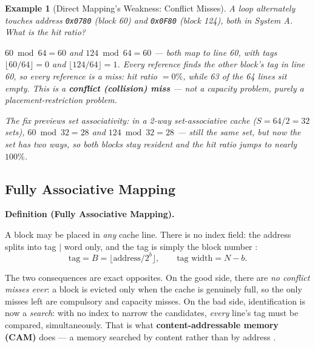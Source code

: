 \documentclass[11pt]{article}
\newtheorem{example}{Example}[section]
\newenvironment{definitionbox}[1]{%
  \par\noindent\textbf{Definition (#1).}\ \itshape
}{\par\vspace{0.3em}}
\begin{document}
\begin{example}[Direct Mapping's Weakness: Conflict Misses]
\label{ex:conflict}
A loop alternately touches address \texttt{0x0780} (block 60) and \texttt{0x0F80} (block 124), both in System A. What is the hit ratio?

$60 \bmod 64 = 60$ and $124 \bmod 64 = 60$ --- both map to line 60, with tags $\lfloor 60/64 \rfloor = 0$ and $\lfloor 124/64 \rfloor = 1$. Every reference finds the \emph{other} block's tag in line 60, so every reference is a miss: hit ratio $= 0\%$, while 63 of the 64 lines sit empty. This is a \textbf{conflict (collision) miss} --- not a capacity problem, purely a placement-restriction problem.

The fix previews set associativity: in a 2-way set-associative cache ($S = 64/2 = 32$ sets), $60 \bmod 32 = 28$ and $124 \bmod 32 = 28$ --- still the same set, but now the set has \emph{two} ways, so both blocks stay resident and the hit ratio jumps to nearly $100\%$.
\end{example}

\subsection{Fully Associative Mapping}
\label{sec:fully}

\begin{definitionbox}{Fully Associative Mapping}
A block may be placed in \emph{any} cache line. There is no index field: the address splits into tag $\mid$ word only, and the tag is simply the block number \cite[Fig.~5.10, PDF p.~195]{Stallings2015_computer_organization}:
\[
  \text{tag} = B = \lfloor \text{address} / 2^b \rfloor ,
  \qquad \text{tag width} = N - b .
\]
\end{definitionbox}

The two consequences are exact opposites. On the good side, there are \emph{no conflict misses ever}: a block is evicted only when the cache is genuinely full, so the only misses left are compulsory and capacity misses. On the bad side, identification is now a \emph{search}: with no index to narrow the candidates, \emph{every} line's tag must be compared, simultaneously. That is what \textbf{content-addressable memory (CAM)} does --- a memory searched by content rather than by address \cite[PDF pp.~193--194]{Stallings2015_computer_organization}.
\end{document}
